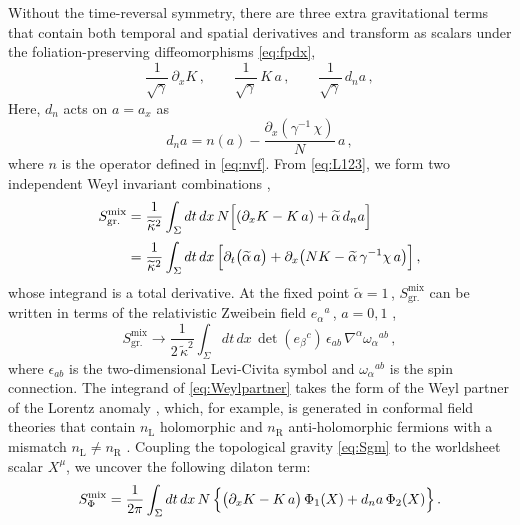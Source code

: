 \documentclass[11pt]{article}
\newcommand{\be}{\begin{equation}}
\newcommand{\ee}{\end{equation}}
\newcommand{\lr}{\left (}
\newcommand{\rr}{\right )}
\newcommand{\p}{\partial}
\renewcommand{\tilde}[1]{\widetilde{#1}}
\begin{document}
Without the time-reversal symmetry, there are three extra gravitational terms that contain both temporal and spatial derivatives and transform as scalars under the foliation-preserving diffeomorphisms \eqref{eq:fpdx},
%
\be \label{eq:L123}
	\frac{1}{\sqrt{\gamma}} \, \p_x K\,,
		\qquad
	\frac{1}{\sqrt{\gamma}} \, K \, a\,,
		\qquad
	\frac{1}{\sqrt{\gamma}} \, d_n a\,,
\ee
%
Here, $d_n$ acts on $a = a_x$ as
%
\be
	d_n a = n (a) - \frac{\p_x (\gamma^{-1} \, \chi)}{N} \, a\,,
\ee
%
where $n$ is the operator defined in \eqref{eq:nvf}. From \eqref{eq:L123}, we form two independent Weyl invariant combinations \cite{Arav:2014goa},
%
\begin{align} \label{eq:Sgm}
\begin{split}
	S^\text{mix}_\text{gr.} & = \frac{1}{{\tilde{\kappa}}^2} \int_\Sigma dt \, dx \, N \Bigl[ \lr \p_x K - K \, a \rr + \tilde{\alpha} \, d_n a \Bigr] \\[2pt]
		& = \frac{1}{{\tilde{\kappa}}^2} \int_\Sigma dt \, dx \, \Bigl[ \p_t \bigl( \tilde{\alpha} \, a \bigr) + \p_x \bigl( N K - \tilde{\alpha} \, \gamma^{-1} \chi \, a \bigr) \Bigr]\,,
\end{split}
\end{align}
%
whose integrand is a total derivative. At the fixed point $\tilde{\alpha} = 1$\,, $S^\text{mix}_\text{gr.}$ can be written in terms of the relativistic Zweibein field $e_\alpha{}^a$\,, $a = 0, 1$ \cite{Arav:2014goa},
%
\be \label{eq:Weylpartner}
	S^\text{mix}_\text{gr.} \rightarrow \frac{1}{2 \, {\tilde{\kappa}}^2} \int_\Sigma dt \, dx \, \det (e_\beta{}^c) \, \epsilon_{ab} \, \nabla^\alpha \omega_\alpha{}^{ab}\,,
\ee
%
where $\epsilon_{ab}$ is the two-dimensional Levi-Civita symbol and $\omega_\alpha{}^{ab}$ is the spin connection. The integrand of \eqref{eq:Weylpartner} takes the form of the Weyl partner of the Lorentz anomaly \cite{bertlmann2000anomalies}, which, for example, is generated in conformal field theories that contain $n_\text{L}$ holomorphic and $n_\text{R}$ anti-holomorphic fermions with a mismatch $n_\text{L} \neq n_\text{R}$ \cite{Chamseddine:1992ry}. 
Coupling the topological gravity \eqref{eq:Sgm} to the worldsheet scalar $X^\mu$, we uncover the following dilaton term:
%
\be \label{eq:SmPhi}
	S^\text{mix}_\Phi = \frac{1}{2\pi} \int_\Sigma dt \, dx \, N \, \Bigl\{ \bigl( \p_x K - K \, a \bigr) \, \Phi_1 (X) + d_n a \, \Phi_2 (X) \Bigr\}\,.
\ee
\end{document}
